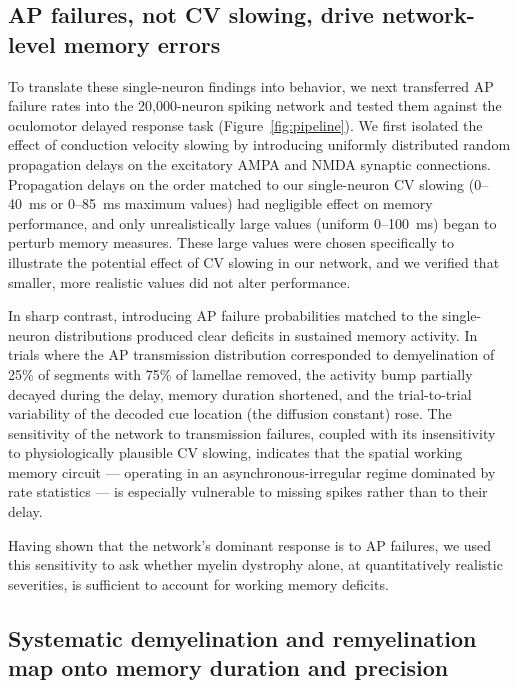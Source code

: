 \documentclass[11pt]{article}
\begin{document}
\subsection{AP failures, not CV slowing, drive network-level memory errors}

To translate these single-neuron findings into behavior, we next transferred AP failure rates into the 20{,}000-neuron spiking network and tested them against the oculomotor delayed response task (Figure~\ref{fig:pipeline}). We first isolated the effect of conduction velocity slowing by introducing uniformly distributed random propagation delays on the excitatory AMPA and NMDA synaptic connections. Propagation delays on the order matched to our single-neuron CV slowing (0--40~ms or 0--85~ms maximum values) had negligible effect on memory performance, and only unrealistically large values (uniform 0--100~ms) began to perturb memory measures. These large values were chosen specifically to illustrate the potential effect of CV slowing in our network, and we verified that smaller, more realistic values did not alter performance.

In sharp contrast, introducing AP failure probabilities matched to the single-neuron distributions produced clear deficits in sustained memory activity. In trials where the AP transmission distribution corresponded to demyelination of 25\% of segments with 75\% of lamellae removed, the activity bump partially decayed during the delay, memory duration shortened, and the trial-to-trial variability of the decoded cue location (the diffusion constant) rose. The sensitivity of the network to transmission failures, coupled with its insensitivity to physiologically plausible CV slowing, indicates that the spatial working memory circuit --- operating in an asynchronous-irregular regime dominated by rate statistics \citep{hansel2013short} --- is especially vulnerable to missing spikes rather than to their delay.

Having shown that the network's dominant response is to AP failures, we used this sensitivity to ask whether myelin dystrophy alone, at quantitatively realistic severities, is sufficient to account for working memory deficits.

\subsection{Systematic demyelination and remyelination map onto memory duration and precision}
\end{document}
